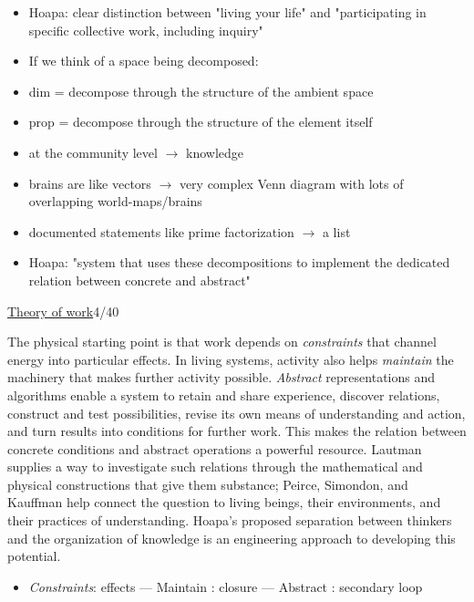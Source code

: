 \documentclass[a4paper,10pt]{article}
\newcommand{\slidehead}[2]{\par\addvspace{7pt}\noindent\underline{#1}\hfill{\color{gray}#2}\par\nopagebreak\vspace{1pt}}
\newcommand{\marked}[1]{\par\addvspace{2pt}{\bfseries #1}\par\nopagebreak}
\renewenvironment{leftbar}{%
  \def\FrameCommand{{\color{black!30}\vrule width 1.2pt}\hspace{6pt}}%
  \MakeFramed{\advance\hsize-\width \FrameRestore}}{\endMakeFramed}
\newenvironment{commentary}{\par\vspace{-2pt}\begin{leftbar}\color{black!80}}{\end{leftbar}}
\begin{document}
\begin{commentary}
\begin{itemize}
\item Hoapa: clear distinction between "living your life" and "participating in specific collective work, including inquiry"
\end{itemize}
\marked{\textcolor{decompositionocean}{Decomposition}}
\begin{itemize}
\item If we think of a space being decomposed:
\item dim = decompose through the structure of the ambient space
\item prop = decompose through the structure of the element itself
\end{itemize}\vspace{2pt}
\begin{itemize}
\item at the community level \ensuremath{\to} knowledge
\item brains are like vectors \ensuremath{\to} very complex Venn diagram with lots of overlapping world-maps/brains
\item documented statements like prime factorization \ensuremath{\to} a list
\item Hoapa: "system that uses these decompositions to implement the dedicated relation between concrete and abstract"
\end{itemize}
\end{commentary}
\slidehead{Theory of work}{4/40}
The physical starting point is that work depends on \textcolor{constraintred}{\emph{constraints}} that channel energy into particular effects. In living systems, activity also helps \textcolor{permaculturegreen}{\emph{maintain}} the machinery that makes further activity possible. \textcolor{abstractmirrorblue}{\emph{Abstract}} representations and algorithms enable a system to retain and share experience, discover relations, construct and test possibilities, revise its own means of understanding and action, and turn results into conditions for further work. This makes the relation between concrete conditions and abstract operations a powerful resource. Lautman supplies a way to investigate such relations through the mathematical and physical constructions that give them substance; Peirce, Simondon, and Kauffman help connect the question to living beings, their environments, and their practices of understanding. Hoapa's proposed separation between thinkers and the organization of knowledge is an engineering approach to developing this potential.\par
\begin{itemize}
\item \textcolor{constraintred}{\emph{Constraints}}: effects — Maintain : closure — Abstract : secondary loop
\end{itemize}
\end{document}
